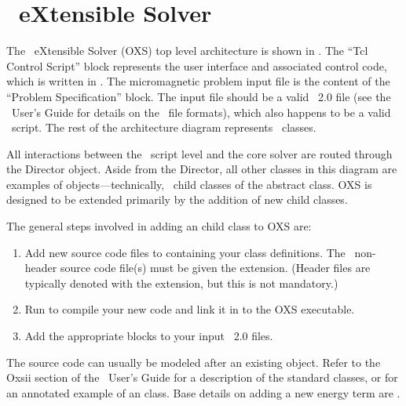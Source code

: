 \section{\OOMMF\ eXtensible Solver}\label{sec:oxs}

The \OOMMF\ eXtensible Solver (OXS) top level architecture is shown in
.
The ``Tcl Control Script'' block represents the user interface and
associated control code, which is written in \Tcl.  The
micromagnetic problem input file is the content of the ``Problem
Specification'' block.  The input file should be a valid \MIF~2.0 file
(see the \OOMMF\ User's Guide for details on the \MIF\ file formats),
which also happens to be a valid \Tcl\ script.  The rest of the
architecture diagram represents \Cplusplus\ classes.


All interactions between the \Tcl\ script level and the core solver are
routed through the Director object.  Aside from the Director, all other
classes in this diagram are examples of 
objects---technically, \Cplusplus\ child classes of the abstract
 class.  OXS is designed to be extended primarily by the
addition of new  child classes.

The general steps involved in adding an  child class to OXS
are:
\begin{enumerate}
\item Add new source code files to  containing
your class definitions.  The \Cplusplus\ non-header source code file(s)
must be given the  extension.  (Header files are typically
denoted with the  extension, but this is not mandatory.)
\item Run  to compile your new code and link it in to the OXS
executable.
\item Add the appropriate  blocks to your input \MIF~2.0
files.
\end{enumerate}
The source code can usually be modeled after an existing 
object.  Refer to the Oxsii section of the \OOMMF\ User's Guide for a
description of the standard  classes, or
 for an annotated example of
an  class.  Base details on adding a new energy term are
.

